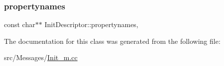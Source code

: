 \subsubsection{\texorpdfstring{propertynames}{propertynames}}
{\footnotesize\ttfamily const char$\ast$$\ast$ Init\+Descriptor\+::propertynames\hspace{0.3cm}{\ttfamily [mutable]}, {\ttfamily [private]}}



The documentation for this class was generated from the following file\+:\begin{DoxyCompactItemize}
\item 
src/\+Messages/\hyperlink{_init__m_8cc}{Init\+\_\+m.\+cc}\end{DoxyCompactItemize}
